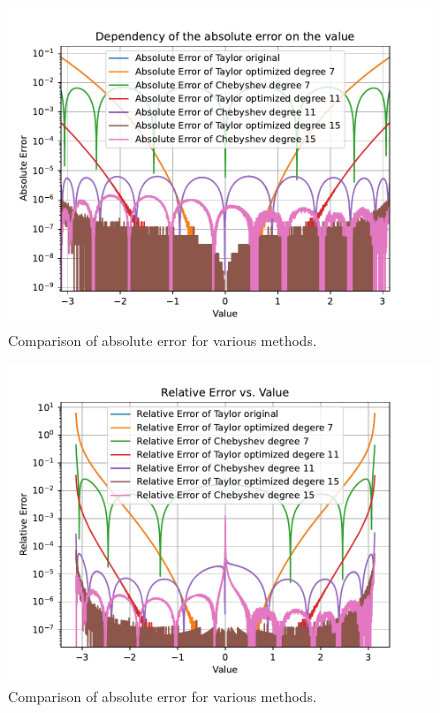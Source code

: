 \documentclass[12pt]{article}
\begin{document}
\begin{figure}[h]
  \centering
  \includegraphics[width=\textwidth]{plots/accuracy/inc_abs_pi_001.pdf}
  \caption{Comparison of absolute error for various methods.}
  \label{fig:abs_error}
\end{figure}

\begin{figure}[h]
  \centering
  \includegraphics[width=\textwidth]{plots/accuracy/inc_rel_pi_001.pdf}
  \caption{Comparison of absolute error for various methods.}
  \label{fig:rel_error}
\end{figure}
\end{document}
